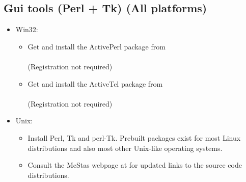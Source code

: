 \subsection{Gui tools (Perl + Tk) (All platforms)}
\label{s:perltk}
\begin{itemize}
\item{Win32:}
  \begin{itemize}
  \item{Get and install the ActivePerl package from\\
      \\(Registration
      not required)}
  \item{Get and install the ActiveTcl package from\\
      \\(Registration
      not required)}
  \end{itemize}
\item{Unix:}
  \begin{itemize}
    \item{Install Perl, Tk and perl-Tk. Prebuilt packages exist for
      most Linux distributions and also most other Unix-like operating
      systems.}
    \item{Consult the McStas webpage at  for updated links to the source code distributions.}
    \end{itemize}
  \end{itemize}
